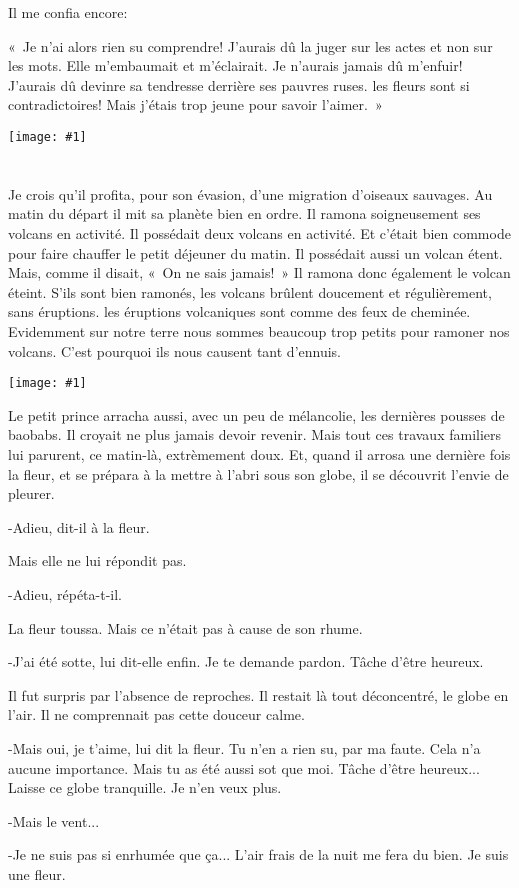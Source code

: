 \documentclass{report}
\newcommand{\parachapter}[2][]{\chapter[#1]{#2}}
\newcommand{\incpic}[1]{%
\begin{center}
    \texttt{[image: \#1]}
\end{center}%
}
\begin{document}
Il me confia encore:

«~Je n'ai alors rien su comprendre! J'aurais dû la juger sur les actes et non sur les mots. Elle m'embaumait et m'éclairait. Je n'aurais jamais dû m'enfuir! J'aurais dû devinre sa tendresse derrière ses pauvres ruses. les fleurs sont si contradictoires! Mais j'étais trop jeune pour savoir l'aimer.~»
\incpic{pic/image22.jpeg}
\parachapter[IX]{} %
Je crois qu'il profita, pour son évasion, d'une migration d'oiseaux sauvages. Au matin du départ il mit sa planète bien en ordre. Il ramona soigneusement ses volcans en activité. Il possédait deux volcans en activité. Et c'était bien commode pour faire chauffer le petit déjeuner du matin. Il possédait aussi un volcan étent. Mais, comme il disait, «~On ne sais jamais!~» Il ramona donc également le volcan éteint. S'ils sont bien ramonés, les volcans brûlent doucement et régulièrement, sans éruptions. les éruptions volcaniques sont comme des feux de cheminée. Evidemment sur notre terre nous sommes beaucoup trop petits pour ramoner nos volcans. C'est pourquoi ils nous causent tant d'ennuis. 

\incpic{pic/image23.jpeg}

Le petit prince arracha aussi, avec un peu de mélancolie, les dernières pousses de baobabs. Il croyait ne plus jamais devoir revenir. Mais tout ces travaux familiers lui parurent, ce matin-là, extrèmement doux. Et, quand il arrosa une dernière fois la fleur, et se prépara à la mettre à l'abri sous son globe, il se découvrit l'envie de pleurer.

-Adieu, dit-il à la fleur.

Mais elle ne lui répondit pas.

-Adieu, répéta-t-il.

La fleur toussa. Mais ce n'était pas à cause de son rhume.

-J'ai été sotte, lui dit-elle enfin. Je te demande pardon. Tâche d'être heureux.

Il fut surpris par l'absence de reproches. Il restait là tout déconcentré, le globe en l'air. Il ne comprennait pas cette douceur calme.

-Mais oui, je t'aime, lui dit la fleur. Tu n'en a rien su, par ma faute. Cela n'a aucune importance. Mais tu as été aussi sot que moi. Tâche d'être heureux... Laisse ce globe tranquille. Je n'en veux plus.

-Mais le vent...

-Je ne suis pas si enrhumée que ça... L'air frais de la nuit me fera du bien. Je suis une fleur.
\end{document}
